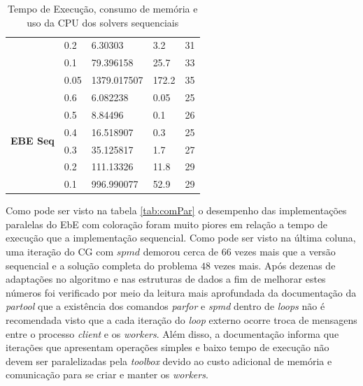 \documentclass[
    12pt,               %
    openright,          %
    oneside,
    a4paper,            %
    english,            %
    french,             %
    spanish,            %
    brazil              %
    ]{abntex2}
\begin{document}
\begin{table}[]
\begin{tabular}{|l|l|l|l|l|}
		& 0.2           & 6.30303            & 3.2                 & 31             \\ \cline{2-5} 
		& 0.1           & 79.396158          & 25.7                & 33             \\ \cline{2-5} 
		& 0.05          & 1379.017507        & 172.2               & 35             \\ \hline
		\multirow{6}{*}{\textbf{EBE Seq}}       & 0.6           & 6.082238           & 0.05                & 25             \\ \cline{2-5} 
		& 0.5           & 8.84496            & 0.1                 & 26             \\ \cline{2-5} 
		& 0.4           & 16.518907          & 0.3                 & 25             \\ \cline{2-5} 
		& 0.3           & 35.125817          & 1.7                 & 27             \\ \cline{2-5} 
		& 0.2           & 111.13326          & 11.8                & 29             \\ \cline{2-5} 
		& 0.1           & 996.990077         & 52.9                & 29             \\ \hline
	\end{tabular}
	\caption{Tempo de Execução, consumo de memória e uso da CPU dos solvers sequenciais}	
	\label{tab:seq}	
\end{table}

Como pode ser visto na tabela \ref{tab:comPar} o desempenho das implementações paralelas do EbE com coloração foram muito piores em relação a tempo de execução que a implementação sequencial. Como pode ser visto na última coluna, uma iteração do CG com $spmd$ demorou cerca de $66$ vezes mais que a versão sequencial e a solução completa  do problema $48$ vezes mais. Após dezenas de adaptações no algoritmo e nas estruturas de dados a fim de melhorar estes números foi verificado por meio da leitura mais aprofundada da documentação da \textit{partool} que a existência dos comandos \textit{parfor} e \textit{spmd} dentro de \textit{loops} não é recomendada visto que a cada iteração do \textit{loop} externo ocorre troca de mensagens entre o processo \textit{client} e os \textit{workers}. Além disso, a documentação informa que iterações que apresentam operações simples e baixo tempo de execução não devem ser paralelizadas pela  \textit{toolbox} devido ao custo adicional de memória e comunicação para se criar e manter os \textit{workers}.
\end{document}
